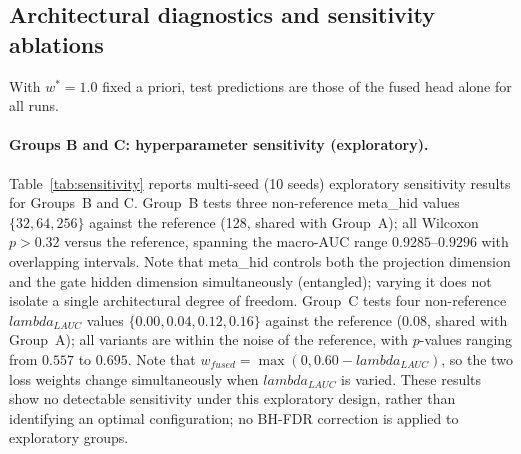 \documentclass[mathematics,article,submit,pdftex]{Definitions/mdpi}
\def\texttt#1{#1}%
\def\mathrm#1{#1}%
\def\lambda{lambda }%
\begin{document}
\subsection{Architectural diagnostics and sensitivity ablations}
\label{sec:sensitivity}
With $w^{\ast}{=}1.0$ fixed a priori, test predictions are those of the fused head alone for all runs.

\paragraph{Groups B and C: hyperparameter sensitivity (exploratory).}
Table~\ref{tab:sensitivity} reports multi-seed (10 seeds) exploratory sensitivity results for Groups~B and C. Group~B tests three non-reference \texttt{meta\_hid} values $\{32, 64, 256\}$ against the reference (128, shared with Group~A); all Wilcoxon $p{>}0.32$ versus the reference, spanning the macro-AUC range $0.9285$--$0.9296$ with overlapping intervals. Note that \texttt{meta\_hid} controls both the projection dimension and the gate hidden dimension simultaneously (entangled); varying it does not isolate a single architectural degree of freedom. Group~C tests four non-reference $\lambda_{\mathrm{LAUC}}$ values $\{0.00, 0.04, 0.12, 0.16\}$ against the reference (0.08, shared with Group~A); all variants are within the noise of the reference, with $p$-values ranging from $0.557$ to $0.695$. Note that $w_{\mathrm{fused}} = \max(0, 0.60 - \lambda_{\mathrm{LAUC}})$, so the two loss weights change simultaneously when $\lambda_{\mathrm{LAUC}}$ is varied. These results show no detectable sensitivity under this exploratory design, rather than identifying an optimal configuration; no BH-FDR correction is applied to exploratory groups.
\end{document}
